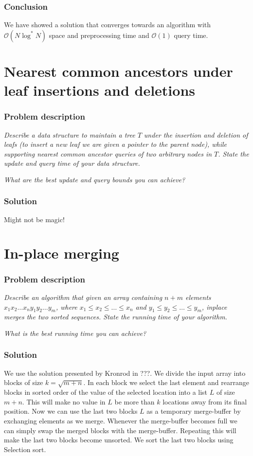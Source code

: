 \documentclass[a4paper,oneside,article,11pt]{memoir}
\begin{document}
\subsection{Conclusion}
We have showed a solution that converges towards an algorithm with $\mathcal{O}(N \log^* N)$ space and preprocessing time and $\mathcal{O}(1)$ query time.

\chapter{Nearest common ancestors under leaf insertions and deletions}
\label{chp:LCA}
\subsection{Problem description}
\textit{Describe a data structure to maintain a tree $T$ under the insertion and deletion of leafs (to insert a new leaf we are given a pointer to the parent node), while supporting nearest common ancestor queries of two arbitrary nodes in $T$. State the update and query time of your data structure.}

\textit{What are the best update and query bounds you can achieve?}

\subsection{Solution}
Might not be magic!

\chapter{In-place merging}
\label{chp:inplace}
\subsection{Problem description}
\textit{Describe an algorithm that given an array containing $n+m$ elements $x_1x_2\dots x_ny_1y_2\dots y_m$, where $x_1\leq x_2\leq \dots \leq x_n$ and $y_1\leq y_2\leq \dots \leq y_m$, inplace merges the two sorted sequences. State the running time of your algorithm.}

\textit{What is the best running time you can achieve?}

\subsection{Solution}
We use the solution presented by Kronrod in ???. We divide the input array into blocks of size $k = \sqrt{m+n}$. In each block we select the last element and rearrange blocks in sorted order of the value of the selected location into a list $L$ of size $m+n$. This will make no value in $L$ be more than $k$ locations away from its final position.
Now we can use the last two blocks $L$ as a temporary merge-buffer by exchanging elements as we merge. Whenever the merge-buffer becomes full we can simply swap the merged blocks with the merge-buffer. Repeating this will make the last two blocks become unsorted. We sort the last two blocks using Selection sort.
\end{document}
